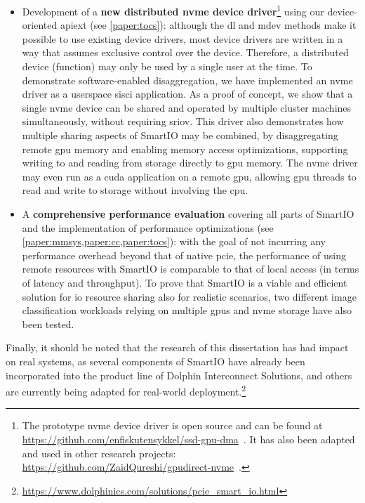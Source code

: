 \begin{itemize}
\item Development of a \textbf{new distributed \gls{nvme} device driver}\footnote{The prototype \gls{nvme} device driver is open source and can be found at \mbox{\url{https://github.com/enfiskutensykkel/ssd-gpu-dma}}~.
    It has also been adapted and used in other research projects: \mbox{\url{https://github.com/ZaidQureshi/gpudirect-nvme}}~\cite{Qureshi2022}.}
    using our device-oriented \gls{apiext} (see \cref{paper:tocs}):
        although the \gls{dl} and \gls{mdev} methods make it possible to use existing device drivers, most device drivers are written in a way that assumes exclusive control over the device. Therefore, a distributed device (\gls{function}) may only be used by a single user at the time.
    To demonstrate software-enabled \gls{disaggregation}, we have implemented an \gls{nvme} driver as a \gls{userspace} \gls{sisci} application.
    As a proof of concept, we show that a single \gls{nvme} device can be shared and operated by multiple cluster machines simultaneously, without requiring \gls{sriov}.
	This driver also demonstrates how multiple sharing aspects of SmartIO may be combined, 
        by \gls{disaggregating} remote \gls{gpu} memory and enabling memory access optimizations, supporting writing to and reading from storage directly to \gls{gpu} memory.
        The \gls{nvme} driver may even run as a \gls{cuda} application on a remote \gls{gpu}, allowing \gls{gpu} threads to read and write to storage without involving the \gls{cpu}.

    \item A \textbf{comprehensive performance evaluation} covering all parts of SmartIO and the implementation of performance optimizations (see \cref{paper:mmsys,paper:cc,paper:tocs}):
        with the goal of not incurring any performance overhead beyond that of native \gls{pcie}, the performance of using remote resources with SmartIO is comparable to that of local access (in terms of latency and throughput).
        To prove that SmartIO is a viable and efficient solution for \gls{io} resource sharing also for realistic scenarios, two different image classification workloads relying on multiple \glspl{gpu} and \gls{nvme} storage have also been tested.
	
\end{itemize}
%
Finally, it should be noted that the research of this dissertation has had impact on real systems, as several components of SmartIO have already been incorporated into the product line of Dolphin Interconnect Solutions, and others are currently being adapted for real-world deployment.\footnote{{\url{https://www.dolphinics.com/solutions/pcie_smart_io.html}}}


